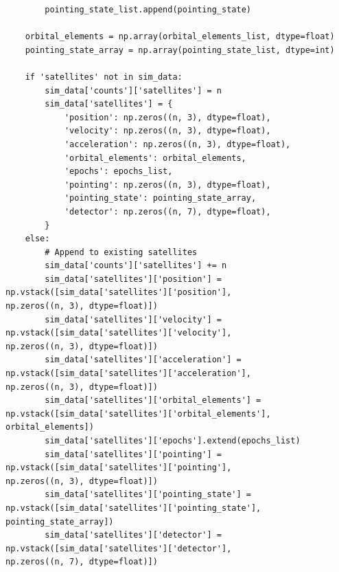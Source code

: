 \documentclass[11pt]{article}
\begin{document}
\begin{Verbatim}
        pointing_state_list.append(pointing_state)

    orbital_elements = np.array(orbital_elements_list, dtype=float)
    pointing_state_array = np.array(pointing_state_list, dtype=int)

    if 'satellites' not in sim_data:
        sim_data['counts']['satellites'] = n
        sim_data['satellites'] = {
            'position': np.zeros((n, 3), dtype=float),
            'velocity': np.zeros((n, 3), dtype=float),
            'acceleration': np.zeros((n, 3), dtype=float),
            'orbital_elements': orbital_elements,
            'epochs': epochs_list,
            'pointing': np.zeros((n, 3), dtype=float),
            'pointing_state': pointing_state_array,
            'detector': np.zeros((n, 7), dtype=float),
        }
    else:
        # Append to existing satellites
        sim_data['counts']['satellites'] += n
        sim_data['satellites']['position'] = np.vstack([sim_data['satellites']['position'],
np.zeros((n, 3), dtype=float)])
        sim_data['satellites']['velocity'] = np.vstack([sim_data['satellites']['velocity'],
np.zeros((n, 3), dtype=float)])
        sim_data['satellites']['acceleration'] = np.vstack([sim_data['satellites']['acceleration'],
np.zeros((n, 3), dtype=float)])
        sim_data['satellites']['orbital_elements'] = np.vstack([sim_data['satellites']['orbital_elements'],
orbital_elements])
        sim_data['satellites']['epochs'].extend(epochs_list)
        sim_data['satellites']['pointing'] = np.vstack([sim_data['satellites']['pointing'],
np.zeros((n, 3), dtype=float)])
        sim_data['satellites']['pointing_state'] = np.vstack([sim_data['satellites']['pointing_state'],
pointing_state_array])
        sim_data['satellites']['detector'] = np.vstack([sim_data['satellites']['detector'],
np.zeros((n, 7), dtype=float)])
\end{Verbatim}
\end{document}
